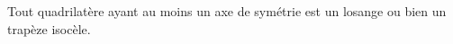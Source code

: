 Tout quadrilatère ayant au moins un axe de symétrie est un losange ou bien un trapèze isocèle.

\begin{reponses}
\end{reponses}

\begin{comment}
Non, ça peut aussi être ce que l'on appelle un 'cerf-volant'.
\end{comment}

